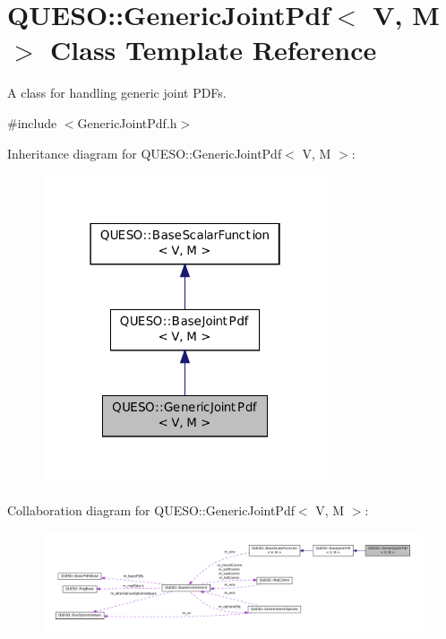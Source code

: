 \hypertarget{class_q_u_e_s_o_1_1_generic_joint_pdf}{\section{Q\-U\-E\-S\-O\-:\-:Generic\-Joint\-Pdf$<$ V, M $>$ Class Template Reference}
\label{class_q_u_e_s_o_1_1_generic_joint_pdf}
}


A class for handling generic joint P\-D\-Fs.  




{\ttfamily \#include $<$Generic\-Joint\-Pdf.\-h$>$}



Inheritance diagram for Q\-U\-E\-S\-O\-:\-:Generic\-Joint\-Pdf$<$ V, M $>$\-:
\nopagebreak
\begin{figure}[H]
\begin{center}
\leavevmode
\includegraphics[width=238pt]{class_q_u_e_s_o_1_1_generic_joint_pdf__inherit__graph}
\end{center}
\end{figure}


Collaboration diagram for Q\-U\-E\-S\-O\-:\-:Generic\-Joint\-Pdf$<$ V, M $>$\-:
\nopagebreak
\begin{figure}[H]
\begin{center}
\leavevmode
\includegraphics[width=350pt]{class_q_u_e_s_o_1_1_generic_joint_pdf__coll__graph}
\end{center}
\end{figure}
